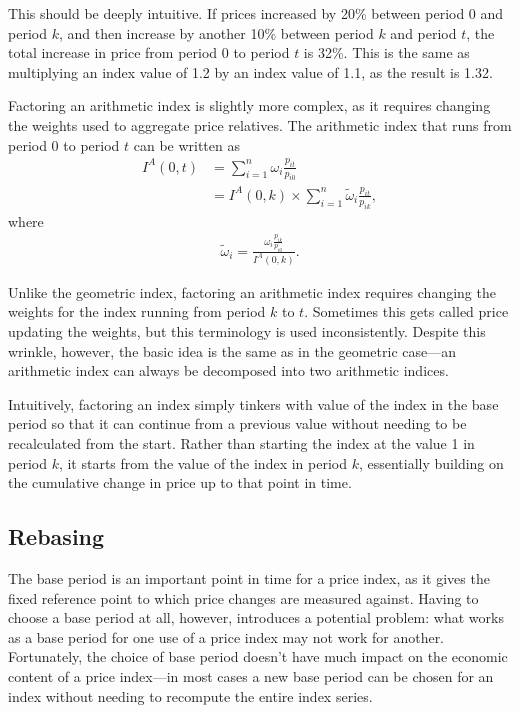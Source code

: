 \documentclass[
]{article}
\begin{document}
This should be deeply intuitive. If prices increased by 20\% between period 0 and period \(k\), and then increase by another 10\% between period \(k\) and period \(t\), the total increase in price from period 0 to period \(t\) is 32\%. This is the same as multiplying an index value of 1.2 by an index value of 1.1, as the result is 1.32.

Factoring an arithmetic index is slightly more complex, as it requires changing the weights used to aggregate price relatives. The arithmetic index that runs from period 0 to period \(t\) can be written as
\begin{align*}
I^{A}(0, t) &= \sum_{i = 1}^{n} \omega_{i} \frac{p_{it}}{p_{i0}} \\  
&= I^{A}(0, k) \times \sum_{i = 1}^{n} \tilde{\omega}_{i} \frac{p_{it}}{p_{ik}},
\end{align*}
where
\begin{align*}
\tilde{\omega}_{i} = \frac{\omega_{i} \frac{p_{ik}}{p_{i0}}}{I^{A}(0, k)}. 
\end{align*}

Unlike the geometric index, factoring an arithmetic index requires changing the weights for the index running from period \(k\) to \(t\). Sometimes this gets called price updating the weights, but this terminology is used inconsistently. Despite this wrinkle, however, the basic idea is the same as in the geometric case---an arithmetic index can always be decomposed into two arithmetic indices.

Intuitively, factoring an index simply tinkers with value of the index in the base period so that it can continue from a previous value without needing to be recalculated from the start. Rather than starting the index at the value 1 in period \(k\), it starts from the value of the index in period \(k\), essentially building on the cumulative change in price up to that point in time.

\hypertarget{rebasing}{%
\subsection{Rebasing}\label{rebasing}}

The base period is an important point in time for a price index, as it gives the fixed reference point to which price changes are measured against. Having to choose a base period at all, however, introduces a potential problem: what works as a base period for one use of a price index may not work for another. Fortunately, the choice of base period doesn't have much impact on the economic content of a price index---in most cases a new base period can be chosen for an index without needing to recompute the entire index series.
\end{document}
